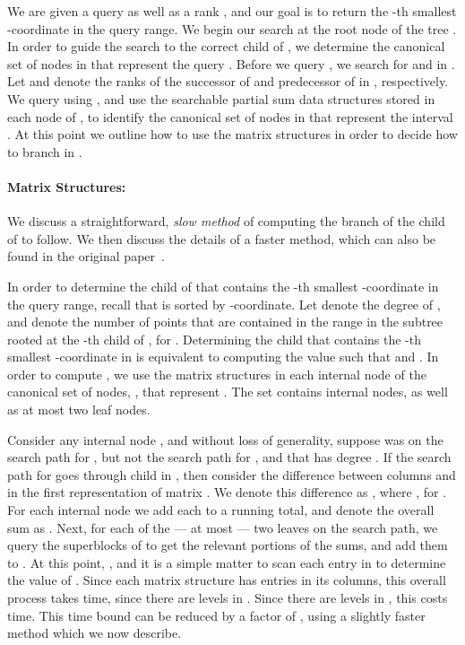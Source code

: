 \documentclass{llncs}
\begin{document}
We are given a query  as well as a rank , and our goal
is to return the -th smallest -coordinate in the query range.
We begin our search at the root node  of the tree .  In order to
guide the search to the correct child of , we determine the
canonical set of nodes in  that represent the query .
Before we query , we search for  and  in .  Let
 and  denote the ranks of the successor of  and
predecessor of  in , respectively. We query  using
, and use the searchable partial sum data structures
stored in each node of , to identify the canonical set of nodes
in  that represent the interval .  At this point we
outline how to use the matrix structures in order to decide how to
branch in .

\paragraph{Matrix Structures:}
We discuss a straightforward, \emph{slow method} of computing the
branch of the child of  to follow.  We then discuss the details of
a faster method, which can also be found in the original
paper~\cite{BGJS10}.

In order to determine the child of  that contains the -th
smallest -coordinate in the query range, recall that  is sorted
by -coordinate.  Let  denote the degree of , and 
denote the number of points that are contained in the range  in the subtree rooted at the -th child of , for . Determining the child that contains the -th smallest
-coordinate in  is equivalent to computing the value
 such that  and .  In order to compute , we use the matrix structures
in each internal node of the canonical set of nodes, , that
represent .  The set  contains 
internal nodes, as well as at most two leaf nodes.

Consider any internal node , and without loss of generality,
suppose  was on the search path for , but not the search path
for , and that  has degree .  If the search path for
 goes through child  in , then consider the difference
between columns  and  in the first representation of matrix
.  We denote this difference as , where , for .  For each internal
node  we add each  to a running total, and denote the
overall sum as .  Next, for each of the --- at most --- two leaves
on the search path, we query the superblocks of  to get the
relevant portions of the sums, and add them to .  At this point,
, and it is a simple matter to scan each entry in  to
determine the value of .  Since each matrix structure has 
entries in its columns, this overall process takes  time, since
there are  levels in .  Since there are
 levels in , this costs  time.  This time bound can be
reduced by a factor of , using
a slightly faster method which we now describe.
\end{document}

